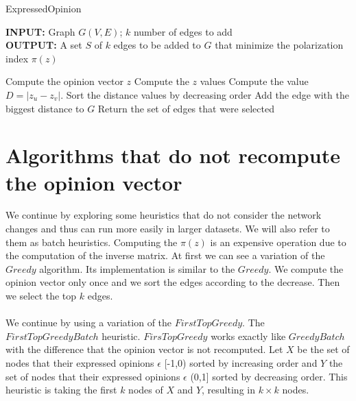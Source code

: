 \begin{algorithm}[H]
	\caption{ExpressedΟpinion}
	\label{alg:expressedOpinion}
	
	\begin{flushleft}
        		\textbf{INPUT:} Graph $G(V, E)$; $k$ number of edges to add\\
		\vspace{6pt}
        		\textbf{OUTPUT:} A set $S$ of $k$ edges to be added to $G$ that minimize the polarization
		\\ index $\pi(z)$
	\end{flushleft}
	
	\begin{algorithmic}[1]
			\STATE Compute the opinion vector $z$
			\STATE Compute the $z$ values
				\STATE Compute the value $D=|z_u - z_v|$.
			\ENDFOR
			\STATE Sort the distance values by decreasing order
			\STATE Add the edge with the biggest distance to $G$
		\ENDFOR
		\STATE Return the set of edges that were selected
	\end{algorithmic}
	
\end{algorithm}

\section{Algorithms that do not recompute the opinion vector}
\label{sec:norecomputeAlgo}

We continue by exploring some heuristics that do not consider the network changes and thus can run more easily in larger datasets. We will also refer to them as batch heuristics. Computing the $\pi(z)$ is an expensive operation due to the computation of the inverse matrix. At first we can see a variation of the $Greedy$ algorithm. Its implementation is similar to the $Greedy$. We compute the opinion vector only once and we sort the edges according to the decrease. Then we select the top $k$ edges.
\\
\\
We continue by using a variation of the $FirstTopGreedy$. The $FirstTopGreedyBatch$ heuristic. $FirsTopGreedy$  works exactly like $GreedyBatch$ with the difference that the opinion vector is not recomputed. Let $X$ be the set of nodes that their expressed opinions $\epsilon$ [-1,0) sorted by increasing order and $Y$ the set of nodes that their expressed opinions $\epsilon$ (0,1] sorted by decreasing order. This heuristic is taking the first $k$ nodes of $X$ and $Y$, resulting in $k \times k$ nodes.
\clearpage

